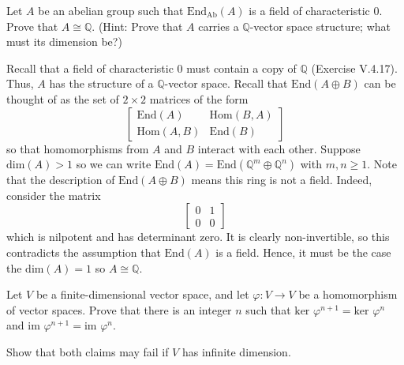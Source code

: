 \documentclass[../../master.tex]{subfiles}
\begin{document}
\begin{problem}
    Let $A$ be an abelian group such that $\text{End}_{\text{Ab}} (A)$ is a field of characteristic 0.
    Prove that $A \cong \mathbb{Q}$.
    (Hint: Prove that $A$ carries a $\mathbb{Q}$-vector space structure; what must its dimension be?)
\end{problem}

\begin{solution}
    Recall that a field of characteristic 0 must contain a copy of $\mathbb{Q}$ (Exercise V.4.17).
    Thus, $A$ has the structure of a $\mathbb{Q}$-vector space.
    Recall that $\text{End} (A \oplus B)$ can be thought of as the set of $2 \times 2$ matrices of the form
    \[
    \begin{bmatrix}
        \text{End}(A) & \text{Hom}(B, A) \\
        \text{Hom}(A, B) & \text{End}(B)
    \end{bmatrix}
    \]
    so that homomorphisms from $A$ and $B$ interact with each other.
    Suppose $\text{dim}(A) > 1$ so we can write $\text{End}(A) = \text{End}(\mathbb{Q}^{m} \oplus \mathbb{Q}^{n})$ with $m, n \geq 1$.
    Note that the description of $\text{End}(A \oplus B)$ means this ring is not a field.
    Indeed, consider the matrix
    \[
    \begin{bmatrix}
        0 & 1 \\
        0 & 0
    \end{bmatrix}
    \]
    which is nilpotent and has determinant zero.
    It is clearly non-invertible, so this contradicts the assumption that $\text{End}(A)$ is a field.
    Hence, it must be the case the $\text{dim}(A) = 1$ so $A \cong \mathbb{Q}$.
\end{solution}

\begin{problem}
    Let $V$ be a finite-dimensional vector space, and let $\varphi: V \to V$ be a homomorphism of vector spaces.
    Prove that there is an integer $n$ such that $\text{ker } \varphi^{n+1} = \text{ker } \varphi^{n}$ and $\text{im } \varphi^{n+1} = \text{im } \varphi^{n}$.

    Show that both claims may fail if $V$ has infinite dimension.
\end{problem} 
\end{document}
